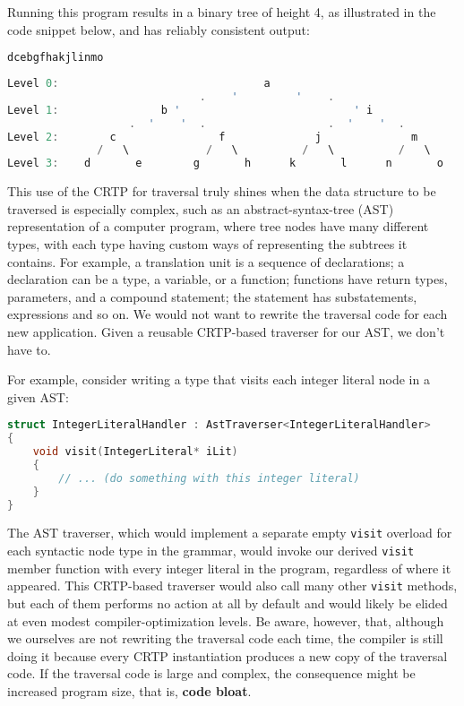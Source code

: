 \noindent Running this program results in a binary tree of height 4, as
illustrated in the code snippet below, and has reliably consistent output:

\begin{lstlisting}[language=C++]
dcebgfhakjlinmo
\end{lstlisting}

\begin{lstlisting}[language=C++]
Level 0:                                a
                              .    '         '    .
Level 1:                b '                           ' i
                   .  '    '  .                   .  '    '  .
Level 2:        c                f              j              m
              /   \            /   \          /   \          /   \
Level 3:    d       e        g       h      k       l      n       o
\end{lstlisting}

\noindent This use of the CRTP for traversal truly shines when the data structure to
be traversed is especially complex, such as an abstract-syntax-tree
(AST) representation of a computer program, where tree nodes have many
different types, with each type having custom ways of representing the
subtrees it contains. For example, a translation unit is a sequence of
declarations; a declaration can be a type, a variable, or a function;
functions have return types, parameters, and a compound statement; the
statement has substatements, expressions and so on. We would not want
to rewrite the traversal code for each new application. Given a reusable
CRTP-based traverser for our AST, we don't have to.

For example, consider writing a type that visits each integer literal
node in a given AST:

\begin{lstlisting}[language=C++]
struct IntegerLiteralHandler : AstTraverser<IntegerLiteralHandler>
{
    void visit(IntegerLiteral* iLit)
    {
        // ... (do something with this integer literal)
    }
}
\end{lstlisting}

\noindent The AST traverser, which would implement a separate empty \texttt{visit}
overload for each syntactic node type in the grammar, would invoke our
derived \texttt{visit} member function with every integer literal in the
program, regardless of where it appeared. This CRTP-based traverser
would also call many other \texttt{visit} methods, but each of them performs no action at all by default and would likely be elided at even modest compiler-optimization levels. Be aware, however, that, although we ourselves are
not rewriting the traversal code each time, the compiler is still doing
it because every CRTP instantiation produces a new copy of the traversal
code. If the traversal code is large and complex, the consequence might
be increased program size, that is, \textbf{code bloat}.

